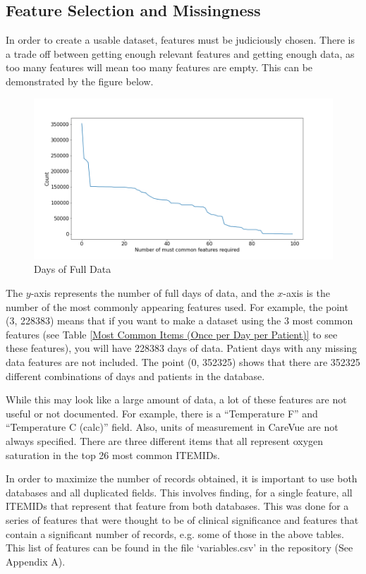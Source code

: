 \documentclass[12pt]{article}
\begin{document}
\subsection{Feature Selection and Missingness}

In order to create a usable dataset, features must be judiciously chosen. There is a trade off between getting enough relevant features and getting enough data, as too many features will mean too many features are empty. This can be demonstrated by the figure below.

\begin{figure}[H]
\centering\caption{Days of Full Data}
\includegraphics[scale=0.45]{Days of Full Data.png}
\end{figure}

The $y$-axis represents the number of full days of data, and the $x$-axis is the number of the most commonly appearing features used. For example, the point (3, 228383) means that if you want to make a dataset using the 3 most common features (see Table \ref{Most Common Items (Once per Day per Patient)} to see these features), you will have 228383 days of data. Patient days with any missing data features are not included. The point (0, 352325) shows that there are 352325 different combinations of days and patients in the database.

While this may look like a large amount of data, a lot of these features are not useful or not documented. For example, there is a ``Temperature F'' and ``Temperature C (calc)'' field. Also, units of measurement in CareVue are not always specified. There are three different items that all represent oxygen saturation in the top 26 most common ITEMIDs. 

In order to maximize the number of records obtained, it is important to use both databases and all duplicated fields. This involves finding, for a single feature, all ITEMIDs that represent that feature from both databases. This was done for a series of features that were thought to be of clinical significance and features that contain a significant number of records, e.g. some of those in the above tables. This list of features can be found in the file `variables.csv' in the repository (See Appendix A).
\end{document}
